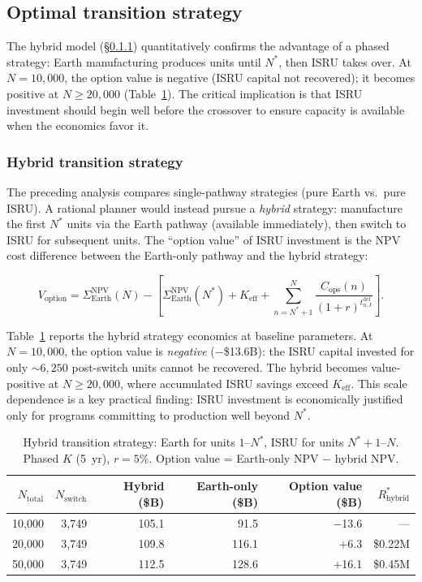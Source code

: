 \documentclass[preprint,12pt]{elsarticle}
\begin{document}
\subsection{Optimal transition strategy}

The hybrid model (\S\ref{sec:hybrid}) quantitatively confirms the advantage of a phased strategy: Earth manufacturing produces units until $N^*$, then ISRU takes over. At $N = 10{,}000$, the option value is negative (ISRU capital not recovered); it becomes positive at $N \geq 20{,}000$ (Table~\ref{tab:hybrid}). The critical implication is that ISRU investment should begin well before the crossover to ensure capacity is available when the economics favor it.

\subsubsection{Hybrid transition strategy}
\label{sec:hybrid}

The preceding analysis compares single-pathway strategies (pure Earth vs.\ pure ISRU). A rational planner would instead pursue a \emph{hybrid} strategy: manufacture the first $N^*$ units via the Earth pathway (available immediately), then switch to ISRU for subsequent units. The ``option value'' of ISRU investment is the NPV cost difference between the Earth-only pathway and the hybrid strategy:

\begin{equation}
  V_{\mathrm{option}} = \Sigma_{\mathrm{Earth}}^{\mathrm{NPV}}(N) - \left[\Sigma_{\mathrm{Earth}}^{\mathrm{NPV}}(N^*) + K_{\mathrm{eff}} + \sum_{n=N^*+1}^{N} \frac{C_{\mathrm{ops}}(n)}{(1+r)^{t_{n,I}^{\mathrm{del}}}}\right].
  \label{eq:hybrid}
\end{equation}

Table~\ref{tab:hybrid} reports the hybrid strategy economics at baseline parameters. At $N = 10{,}000$, the option value is \emph{negative} ($-$\$13.6B): the ISRU capital invested for only ${\sim}6{,}250$ post-switch units cannot be recovered. The hybrid becomes value-positive at $N \geq 20{,}000$, where accumulated ISRU savings exceed $K_{\mathrm{eff}}$. This scale dependence is a key practical finding: ISRU investment is economically justified only for programs committing to production well beyond $N^*$.

\begin{table}[htbp]
\centering
\caption{Hybrid transition strategy: Earth for units $1$--$N^*$, ISRU for units $N^*+1$--$N$. Phased $K$ (5~yr), $r = 5\%$. Option value = Earth-only NPV $-$ hybrid NPV.}
\label{tab:hybrid}
\small
\begin{tabular}{@{}rrrrrr@{}}
\toprule
$N_{\mathrm{total}}$ & $N_{\mathrm{switch}}$ & Hybrid (\$B) & Earth-only (\$B) & Option value (\$B) & $R^*_{\mathrm{hybrid}}$ \\
\midrule
10{,}000  & 3{,}749  & 105.1 & 91.5 & $-$13.6 & --- \\
20{,}000  & 3{,}749  & 109.8 & 116.1 & $+$6.3 & \$0.22M \\
50{,}000  & 3{,}749  & 112.5 & 128.6 & $+$16.1 & \$0.45M \\
\bottomrule
\end{tabular}
\end{table}
\end{document}
